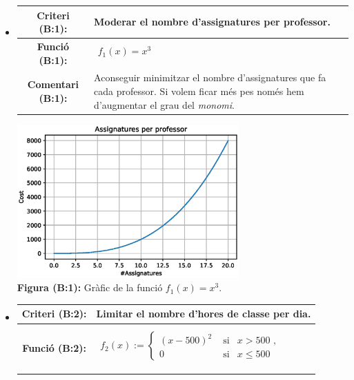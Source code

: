 \documentclass[10pt,twocolumn]{article}
\begin{document}
\begin{itemize}[$\RHD$]
	\item \begin{tabular}{|c|m{50mm}|}
		\hline
		\textbf{Criteri (B:1):}& Moderar el nombre d'assignatures  per professor.\\
		\hline
		\textbf{Funció (B:1):}& $\begin{matrix} \\ f_1(x)=x^3 \\ \\ \end{matrix}$\\
		\hline
		\textbf{Comentari (B:1):}& Aconseguir minimitzar el nombre d'assignatures que fa cada professor. Si volem ficar més pes només hem d'augmentar el grau del \textit{monomi}.\\
		\hline
	\end{tabular}
   \vspace{3mm}
    \includegraphics[width=8.5cm]{asig_mf}
    \\ 
    {
    \textbf{Figura (B:1):} 
    {\footnotesize Gràfic de la funció $f_1(x)=x^3$.}}
\vspace{3mm}
\item 
\begin{tabular}{|c|m{5cm}|}
	\hline
	\textbf{Criteri (B:2):}& Limitar el nombre d'hores de classe per dia.\\
	\hline
	\textbf{Funció (B:2):}& \footnotesize $\begin{matrix} \\ f_2(x):=\left\lbrace 
	\begin{matrix}
		(x-500)^2& \text{ si}& x>500\text{ ,} \\
		0& \text{ si}& x\leq 500& \end{matrix}
	\right.\\ \\ \end{matrix}$\\

\end{tabular}
\end{itemize}
\end{document}
